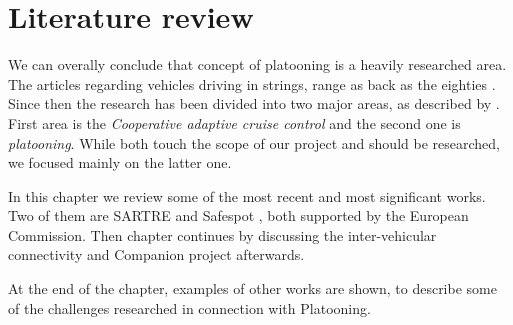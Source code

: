 \section{Literature review}\label{sec:literature}
% 
% 
We can overally conclude that concept of platooning is a heavily researched area. The articles regarding vehicles driving in strings, range as back as the eighties \cite{Peppard1974StringSystems}.
Since then the research has been divided into two major areas, as described by \cite{Vinel2015Vehicle-to-vehicleScenarios}. First area is the \emph{Cooperative adaptive cruise control} and the second one is \emph{platooning}. While both touch the scope of our project and should be researched, we focused mainly on the latter one.\par
% 
In this chapter we review some of the most recent and most significant works. Two of them are SARTRE \cite{Chan2012ProjectSARTRE} and Safespot \cite{Safespot}, both supported by the European Commission. Then chapter continues by discussing the inter-vehicular connectivity and Companion \cite{2016CompanionProject} project afterwards.\par
% 
At the end of the chapter, examples of other works are shown, to describe some of the challenges researched in connection with Platooning.













